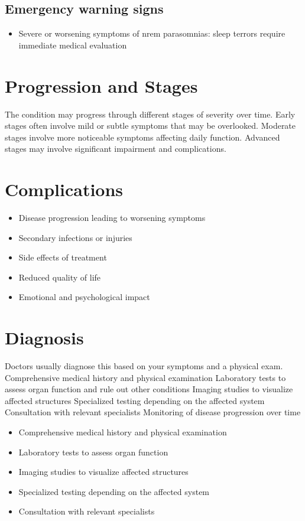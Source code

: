 \subsection{Emergency warning signs}
\begin{itemize}[noitemsep]
  \item Severe or worsening symptoms of nrem parasomnias: sleep terrors require immediate medical evaluation
\end{itemize}
\section{Progression and Stages}
The condition may progress through different stages of severity over time. Early stages often involve mild or subtle symptoms that may be overlooked. Moderate stages involve more noticeable symptoms affecting daily function. Advanced stages may involve significant impairment and complications.
\section{Complications}
\begin{itemize}[noitemsep]
  \item Disease progression leading to worsening symptoms
  \item Secondary infections or injuries
  \item Side effects of treatment
  \item Reduced quality of life
  \item Emotional and psychological impact
\end{itemize}
\section{Diagnosis}
Doctors usually diagnose this based on your symptoms and a physical exam. Comprehensive medical history and physical examination Laboratory tests to assess organ function and rule out other conditions Imaging studies to visualize affected structures Specialized testing depending on the affected system Consultation with relevant specialists Monitoring of disease progression over time

\begin{itemize}[noitemsep]
  \item Comprehensive medical history and physical examination
  \item Laboratory tests to assess organ function
  \item Imaging studies to visualize affected structures
  \item Specialized testing depending on the affected system
  \item Consultation with relevant specialists
\end{itemize}
